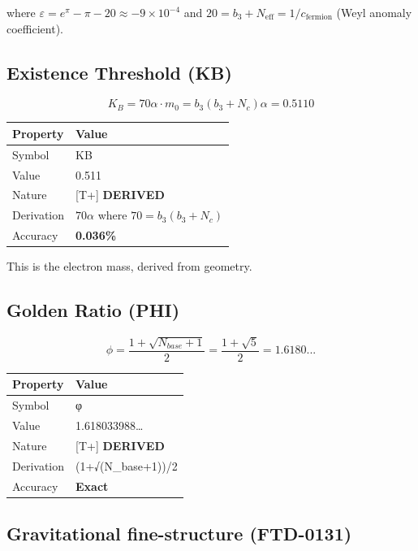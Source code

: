 \documentclass[
  11pt,
  letterpaper,
  twoside,
  openany]{book}
\makeatletter
\let\orig@subsection\subsection
\renewcommand{\subsection}{\needspace{6\baselineskip}\orig@subsection}
\makeatother
\begin{document}
where \(\varepsilon = e^\pi - \pi - 20 \approx -9 \times 10^{-4}\) and
\(20 = b_3 + N_{\text{eff}} = 1/c_{\text{fermion}}\) (Weyl anomaly
coefficient).

\subsection{Existence Threshold (KB)}\label{existence-threshold-kb}

\[
K_B = 70\alpha \cdot m_0 = b_3(b_3 + N_c)\alpha = 0.5110
\]

\begin{longtable}[]{@{}ll@{}}
\toprule\noalign{}
Property & Value \\
\midrule\noalign{}
\endhead
\bottomrule\noalign{}
\endlastfoot
Symbol & KB \\
Value & 0.511 \\
Nature & {[}T+{]} \textbf{DERIVED} \\
Derivation & \(70\alpha\) where \(70 = b_3(b_3+N_c)\) \\
Accuracy & \textbf{0.036\%} \\
\end{longtable}

This is the electron mass, derived from geometry.

\subsection{Golden Ratio (PHI)}\label{golden-ratio-phi}

\[
\phi = \frac{1 + \sqrt{N_{base} + 1}}{2} = \frac{1 + \sqrt{5}}{2} = 1.6180...
\]

\begin{longtable}[]{@{}ll@{}}
\toprule\noalign{}
Property & Value \\
\midrule\noalign{}
\endhead
\bottomrule\noalign{}
\endlastfoot
Symbol & φ \\
Value & 1.618033988\ldots{} \\
Nature & {[}T+{]} \textbf{DERIVED} \\
Derivation & (1+√(N\_base+1))/2 \\
Accuracy & \textbf{Exact} \\
\end{longtable}

\subsection{Gravitational fine-structure
(FTD-0131)}\label{gravitational-fine-structure-ftd-0131}
\end{document}
